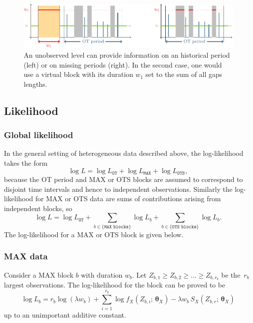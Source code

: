 \documentclass[a4paper]{report}
\newcommand{\bs}{\boldsymbol}
\begin{document}
\begin{figure}
  \centering
  \includegraphics[width=14cm]{images/unobserved.pdf}
  \caption{\label{UNOBSERVED} An unobserved level can provide
    information on an historical period (left) or on missing periods
    (right). In the second case, one would use a virtual block with
    its duration $w_1$ set to the sum of all gaps lengths.}
\end{figure}


\subsection{Likelihood}

\subsubsection{Global likelihood}
In the general setting of heterogeneous data described above, the log-likelihood
takes the form
$$
\log L = \log L_{\texttt{OT}} + \log L_{\texttt{MAX}} + \log L_{\texttt{OTS}}, 
$$
because the OT period and MAX or OTS blocks are assumed to correspond
to disjoint time intervals and hence to independent observations. Similarly
the log-likelihood for MAX or OTS data are sums of contributions arising from independent 
blocks, so
$$
\log L =  \log L_{\texttt{OT}} + 
\sum_{b \in \{\texttt{MAX blocks}\} } \log L_b + \sum_{b \in \{\texttt{OTS blocks}\}} 
\log L_b.
$$ 
The log-likelihood for a MAX or OTS block is given below.

\subsubsection{MAX data}
%
Consider a MAX block $b$ with duration $w_{b}$. 
Let $Z_{b,1} \geqslant Z_{b,2} \geqslant \dots \geqslant Z_{b,r_b}$ 
be the~$r_b$ largest observations. The log-likelihood for the block can be proved to be 
\begin{equation}
  \label{eq:LLH1}
  \log L_b  = r_b  \log(\lambda w_{b}) + \sum_{i=1}^{r_b} \log f_X(Z_{b,i};\,\bs{\theta}_X)  
  -\lambda w_{b} \, S_X(Z_{b,r};\,\bs{\theta}_X)
\end{equation}
up to an unimportant additive constant.
\end{document}
